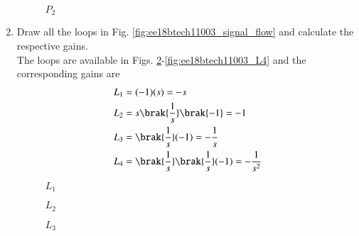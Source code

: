 \begin{enumerate}[label=\thesection.\arabic*.,ref=\thesection.\theenumi]
\begin{figure}[!ht]
\begin{center}
		\resizebox{\columnwidth}{!}{}
	\end{center}
\caption{$P_2$}
\label{fig:ee18btech11003_P2}
\end{figure}
\renewcommand{\thefigure}{\theenumi}
%
\item Draw all the loops in Fig. \ref{fig:ee18btech11003_signal_flow} and calculate the respective gains.
\renewcommand{\thefigure}{\theenumi.\arabic{figure}}
\\
\solution The loops are available in Figs. \ref{fig:ee18btech11003_L1}-\ref{fig:ee18btech11003_L4}
and the corresponding gains are
%
\begin{align}
L_1&=(-1)(s)=-s
\\
L_2&=s\brak{\frac{1}{s}}\brak{-1}=-1
\\
L_3&=\brak{\frac{1}{s}}(-1)=-\frac{1}{s}
\\
L_4&=\brak{\frac{1}{s}}\brak{\frac{1}{s}}(-1)=-\frac{1}{s^2}
\end{align}

\begin{figure}[!ht]
\begin{center}
		
		\resizebox{\columnwidth}{!}{}
	\end{center}
\caption{$L_1$}
\label{fig:ee18btech11003_L1}
\end{figure}



\begin{figure}[!ht]
\begin{center}
		
		\resizebox{\columnwidth}{!}{}
	\end{center}
\caption{$L_2$}
\label{fig:ee18btech11003_L2}
\end{figure}



\begin{figure}[!ht]
\begin{center}
		
		\resizebox{\columnwidth}{!}{}
	\end{center}
\caption{$L_3$}
\label{fig:ee18btech11003_L3}
\end{figure}



\begin{figure}[!ht]
\begin{center}
		

\end{center}
\end{figure}
\end{enumerate}

